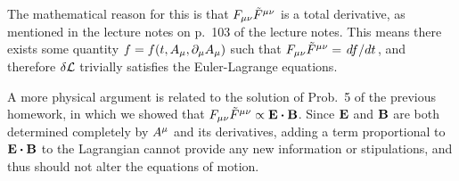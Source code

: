 {		The mathematical reason for this is that $F_{\mu \nu} \tilde{F}^{\mu \nu}$ is a total derivative, as mentioned in the lecture notes on p.~103 of the lecture notes.  This means there exists some quantity $f = f(t, A_\mu, \partial_\mu A_\mu)$ such that $F_{\mu \nu} \tilde{F}^{\mu \nu} = \dv*{f}{t}$, and therefore $\delta \mathcal{L}$ trivially satisfies the Euler-Lagrange equations.
		
		A more physical argument is related to the solution of Prob.~5 of the previous homework, in which we showed that $\Fsmn \Ftmn \propto \vE \vdot \vB$.  Since $\vb{E}$ and $\vb{B}$ are both determined completely by $A^\mu$ and its derivatives, adding a term proportional to $\vE \vdot \vB$ to the Lagrangian cannot provide any new information or stipulations, and thus should not alter the equations of motion.
}